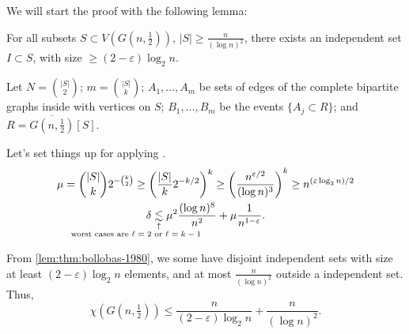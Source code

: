 \begin{sk}
	We will start the proof with the following lemma:

	\begin{lem}\label{lem:thm:bollobas-1980}
		For all subsets $S \subset V\left(G\left(n, \tfrac{1}{2}\right)\right)$, $\left|S\right| \ge \frac{n}{(\log n)^2}$, there exists an independent set $I \subset S$, with size $\ge (2-\varepsilon)\log_2n$.
	\end{lem}
	\begin{sk}
		Let $N = \binom{|S|}{2}$; $m = \binom{|S|}{k}$; $A_1, \dots, A_m$ be sets of edges of the complete bipartite graphs inside with vertices on $S$; $B_1, \dots, B_m$ be the events $\{A_j \subset R\}$; and $R = \overline{G(n, \tfrac{1}{2})}[S]$.

		Let's set things up for applying .
		\begin{gather*}
			\mu = \binom{|S|}{k}2^{-\binom{k}{2}} \ge \left(\frac{|S|}{k} 2^{-k/2}\right)^k \ge \left(\frac{n^{\varepsilon/2}}{(\log n)^3}\right)^k \ge n^{(\varepsilon\log_2n)/2}\\
			\delta \signexpl{\lesssim}{worst cases are $\ell = 2$ or $\ell = k - 1$}{-10em} \mu^2\frac{(\log n)^8}{n^2} + \mu \frac{1}{n^{1-\varepsilon}}.  
		\end{gather*}
	\end{sk}

	From \cref{lem:thm:bollobas-1980}, we some have disjoint independent sets with size at least $(2-\varepsilon)\log_2n$ elements, and at most $\frac{n}{(\log n)^2}$ outside a independent set. Thus,  \[
		\chi\left(G(n, \tfrac{1}{2})\right) \le \frac{n}{(2-\varepsilon)\log_2n} + \frac{n}{(\log{n})^2}.
	\]

\end{sk}
